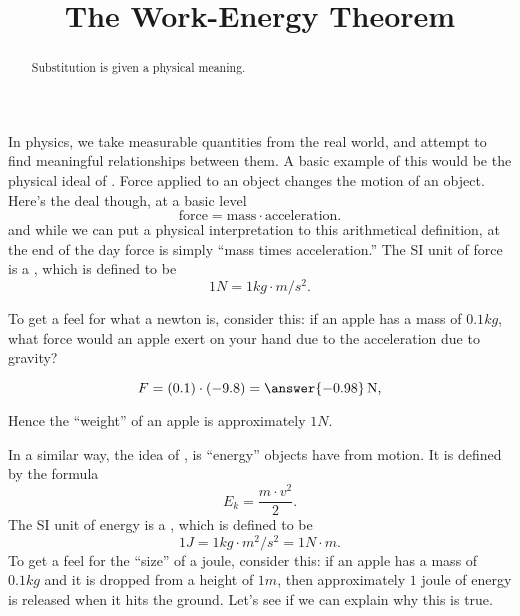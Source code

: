 \documentclass{ximera}
\title[Dig-In:]{The Work-Energy Theorem}
\begin{document}
	\begin{abstract}
		Substitution is given a physical meaning. 
	\end{abstract}
	\maketitle
	
	In physics, we take measurable quantities from the real world, and
	attempt to find meaningful relationships between them. A basic example
	of this would be the physical ideal of . Force applied to an
	object changes the motion of an object. Here's the deal though, at a
	basic level
	\[
	\mathrm{force} = \mathrm{mass} \cdot \mathrm{acceleration}.
	\]
	and while we can put a physical interpretation to this arithmetical
	definition, at the end of the day force is simply ``mass times
	acceleration.'' The SI unit of force is a , which is defined to be
	\[
	1\unit{N} = 1\unit{kg}\cdot \unit{m}/\unit{s}^2. 
	\]
	\begin{question}
		To get a feel for what a newton is, consider this: if an apple has a
		mass of $0.1\unit{kg}$, what force would an apple exert on your hand
		due to the acceleration due to gravity?
		\begin{prompt}
			\[
			F = (0.1) \cdot (-9.8) = \answer{-0.98}\unit{N},
			\]
		\end{prompt}
		\begin{feedback}
			Hence the ``weight'' of an apple is approximately $1\unit{N}$.
		\end{feedback}
	\end{question}
	
	
	In a similar way, the idea of , is ``energy''
	objects have from motion. It is defined by the formula
	\[
	E_k = \frac{m \cdot v^2}{2}.
	\]
	The SI unit of energy is a , which is defined to be
	\[
	1\unit{J} = 1\unit{kg}\cdot \unit{m}^2/\unit{s}^2 = 1\unit{N}\cdot\unit{m}. 
	\]
	To get a feel for the ``size'' of a joule, consider this: if an apple
	has a mass of $0.1\unit{kg}$ and it is dropped from a height of
	$1\unit{m}$, then approximately $1$ joule of energy is released when
	it hits the ground. Let's see if we can explain why this is true.
	
\end{document}
